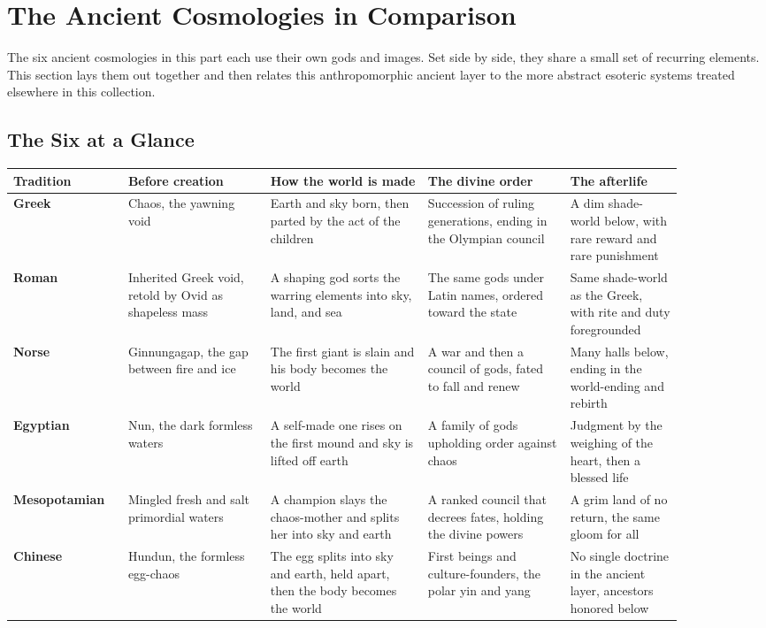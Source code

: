 \section{The Ancient Cosmologies in Comparison}

The six ancient cosmologies in this part each use their own gods and images. Set side by side, they share a small set of recurring elements. This section lays them out together and then relates this anthropomorphic ancient layer to the more abstract esoteric systems treated elsewhere in this collection.

\subsection{The Six at a Glance}

{\footnotesize
\begin{longtable}{L{0.14\linewidth} L{0.19\linewidth} L{0.21\linewidth} L{0.19\linewidth} L{0.15\linewidth}}
\toprule
\textbf{Tradition} & \textbf{Before creation} & \textbf{How the world is made} & \textbf{The divine order} & \textbf{The afterlife} \\
\midrule
\endhead
\textbf{Greek} & Chaos, the yawning void & Earth and sky born, then parted by the act of the children & Succession of ruling generations, ending in the Olympian council & A dim shade-world below, with rare reward and rare punishment \\
\textbf{Roman} & Inherited Greek void, retold by Ovid as shapeless mass & A shaping god sorts the warring elements into sky, land, and sea & The same gods under Latin names, ordered toward the state & Same shade-world as the Greek, with rite and duty foregrounded \\
\textbf{Norse} & Ginnungagap, the gap between fire and ice & The first giant is slain and his body becomes the world & A war and then a council of gods, fated to fall and renew & Many halls below, ending in the world-ending and rebirth \\
\textbf{Egyptian} & Nun, the dark formless waters & A self-made one rises on the first mound and sky is lifted off earth & A family of gods upholding order against chaos & Judgment by the weighing of the heart, then a blessed life \\
\textbf{Mesopotamian} & Mingled fresh and salt primordial waters & A champion slays the chaos-mother and splits her into sky and earth & A ranked council that decrees fates, holding the divine powers & A grim land of no return, the same gloom for all \\
\textbf{Chinese} & Hundun, the formless egg-chaos & The egg splits into sky and earth, held apart, then the body becomes the world & First beings and culture-founders, the polar yin and yang & No single doctrine in the ancient layer, ancestors honored below \\
\bottomrule
\end{longtable}
}

